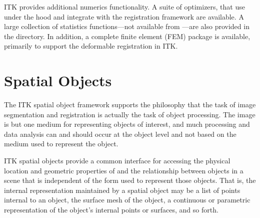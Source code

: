 ITK provides additional numerics functionality. A suite of optimizers, that
use  under the hood and integrate with the registration framework
are available. A large collection of statistics functions---not available from
---are also provided in the 
directory. In addition, a complete finite element (FEM) package is available,
primarily to support the deformable registration in ITK.

%
%
%
%
%
%
\section{Spatial Objects}
\label{sec:SpatialObjects}
%
The ITK spatial object framework supports the philosophy that the task of
image segmentation and registration is actually the task of object
processing. The image is but one medium for representing objects of interest,
and much processing and data analysis can and should occur at the object
level and not based on the medium used to represent the object.

ITK spatial objects provide a common interface for accessing the physical
location and geometric properties of and the relationship between objects in
a scene that is independent of the form used to represent those objects. That
is, the internal representation maintained by a spatial object may be a list
of points internal to an object, the surface mesh of the object, a continuous
or parametric representation of the object's internal points or surfaces, and
so forth.

